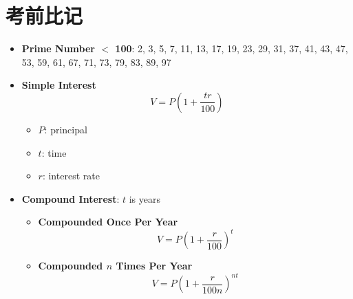 \appendix
\chapter{考前比记}

\begin{multicols}{3}
  \begin{itemize}
    \item \textbf{Prime Number $ < $ 100}: 2, 3, 5, 7, 11, 13, 17, 19, 23, 29,
    31, 37, 41, 43, 47, 53, 59, 61, 67, 71, 73, 79, 83, 89, 97

    \item \textbf{Simple Interest}
    \begin{equation}
      V = P \left( 1 + \frac{tr}{100} \right)
    \end{equation}

    \begin{itemize}
      \item $ P $: principal
      \item $ t $: time
      \item $ r $: interest rate
    \end{itemize}

    \item \textbf{Compound Interest}: $ t $ is years
    \begin{itemize}
      \item \textbf{Compounded Once Per Year}
      \begin{equation}
        V = P \left( 1 + \frac{r}{100} \right)^{t}
      \end{equation}

      \item \textbf{Compounded $ n $ Times Per Year}
      \begin{equation}
        V = P \left( 1 + \frac{r}{100n} \right)^{nt}
      \end{equation}
    \end{itemize}
  \end{itemize}
\end{multicols}
